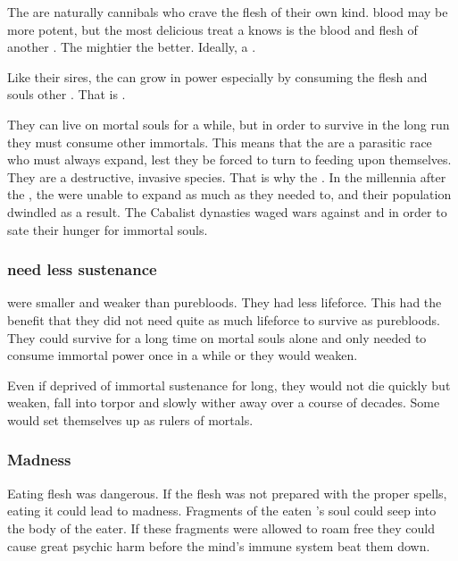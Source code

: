 The \resphain{} are naturally cannibals who crave the flesh of their own kind. 
\Draconian{} blood may be more potent, but the most delicious treat a \resphan{} knows is the blood and flesh of another \resphan{}. 
The mightier the better. 
Ideally, a .

Like their \SitraAchra sires, the \resphain{} can grow in power especially by consuming the flesh and souls other \resphain. 
That is .

They can live on mortal souls for a while, but in order to survive in the long run they must consume other immortals. 
This means that the \resphain{} are a parasitic race who must always expand, lest they be forced to turn to feeding upon themselves. 
They are a destructive, invasive species. 
That is why the \feud{} . 
In the millennia after the , the \resphain{} were unable to expand as much as they needed to, and their population dwindled as a result. 
The Cabalist dynasties waged wars against \Kezerad{} and \Baelzerach{} in order to sate their hunger for immortal souls. 




\subsubsection{\Bezedeth need less sustenance}
\Bezedeth were smaller and weaker than purebloods.
They had less lifeforce. 
This had the benefit that they did not need quite as much lifeforce to survive as purebloods. 
They could survive for a long time on mortal souls alone and only needed to consume immortal power once in a while or they would weaken.

Even if deprived of immortal sustenance for long, they would not die quickly but weaken, fall into torpor and slowly wither away over a course of decades.
Some would set themselves up as rulers of mortals\dash {}.





\subsubsection{Madness}
Eating \resphan flesh was dangerous. 
If the flesh was not prepared with the proper spells, eating it could lead to madness. 
Fragments of the eaten \resphan's soul could seep into the body of the eater. 
If these fragments were allowed to roam free they could cause great psychic harm before the mind's immune system beat them down.





